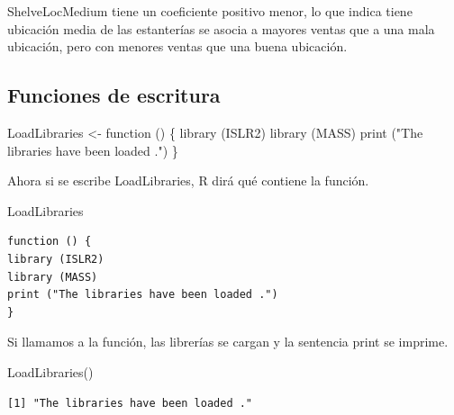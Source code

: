 \documentclass[
  letterpaper,
  DIV=11,
  numbers=noendperiod]{scrartcl}
\newenvironment{Shaded}{\begin{snugshade}}{\end{snugshade}}
\newcommand{\ControlFlowTok}[1]{\textcolor[rgb]{0.00,0.23,0.31}{#1}}
\newcommand{\FunctionTok}[1]{\textcolor[rgb]{0.28,0.35,0.67}{#1}}
\newcommand{\NormalTok}[1]{\textcolor[rgb]{0.00,0.23,0.31}{#1}}
\newcommand{\OtherTok}[1]{\textcolor[rgb]{0.00,0.23,0.31}{#1}}
\newcommand{\StringTok}[1]{\textcolor[rgb]{0.13,0.47,0.30}{#1}}
\begin{document}
ShelveLocMedium tiene un coeficiente positivo menor, lo que indica tiene
ubicación media de las estanterías se asocia a mayores ventas que a una
mala ubicación, pero con menores ventas que una buena ubicación.

\hypertarget{funciones-de-escritura}{%
\subsection{Funciones de escritura}\label{funciones-de-escritura}}

\begin{Shaded}
\begin{Highlighting}[]
\NormalTok{LoadLibraries }\OtherTok{\textless{}{-}} \ControlFlowTok{function}\NormalTok{ () \{}
\FunctionTok{library}\NormalTok{ (ISLR2)}
\FunctionTok{library}\NormalTok{ (MASS)}
\FunctionTok{print}\NormalTok{ (}\StringTok{"The libraries have been loaded ."}\NormalTok{)}
\NormalTok{\}}
\end{Highlighting}
\end{Shaded}

Ahora si se escribe LoadLibraries, R dirá qué contiene la función.

\begin{Shaded}
\begin{Highlighting}[]
\NormalTok{LoadLibraries}
\end{Highlighting}
\end{Shaded}

\begin{verbatim}
function () {
library (ISLR2)
library (MASS)
print ("The libraries have been loaded .")
}
\end{verbatim}

Si llamamos a la función, las librerías se cargan y la sentencia print
se imprime.

\begin{Shaded}
\begin{Highlighting}[]
\FunctionTok{LoadLibraries}\NormalTok{()}
\end{Highlighting}
\end{Shaded}

\begin{verbatim}
[1] "The libraries have been loaded ."
\end{verbatim}
\end{document}
